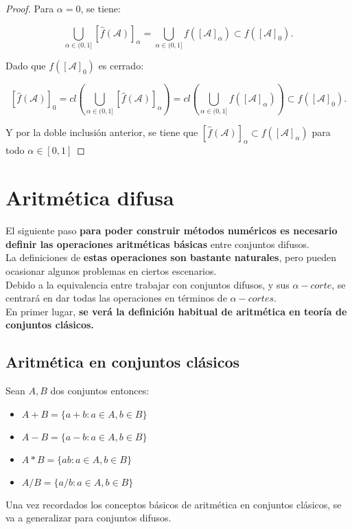 \begin{proof}
    Para $\alpha=0$, se tiene:
    
    $$
    \bigcup_{\alpha \in (0, 1]} [\hat{f}(\mathcal{A})]_\alpha = \bigcup_{\alpha \in (0, 1]} f([\mathcal{A}]_\alpha) \subset f([\mathcal{A}]_0).
	$$
	
	Dado que $f([\mathcal{A}]_0)$ es cerrado:
	
	$$
	[\hat{f}(\mathcal{A})]_0 = cl\left( \bigcup_{\alpha \in (0, 1]} [\hat{f}(\mathcal{A})]_\alpha  \right) = cl\left(\bigcup_{\alpha \in (0, 1]} f([\mathcal{A}]_\alpha) \right)	\subset f([\mathcal{A}]_0).
	    $$
	    
	    Y por la doble inclusión anterior, se tiene que $[\hat{f}(\mathcal{A})]_\alpha \subset f([\mathcal{A}]_\alpha)$ para todo $\alpha \in [0, 1]$
  \end{proof}


  \section{Aritmética difusa}
  El siguiente paso \textbf{para poder construir métodos numéricos es necesario definir las operaciones aritméticas básicas} entre conjuntos difusos.\\
  La definiciones de \textbf{estas operaciones son bastante naturales}, pero pueden ocasionar algunos problemas en ciertos escenarios.\\
  Debido a la equivalencia entre trabajar con conjuntos difusos, y sus $\alpha-corte$, se centrará en dar todas las operaciones en términos de $\alpha-cortes$.\\
  En primer lugar, \textbf{se verá la definición habitual de aritmética en teoría de conjuntos clásicos.}

  \subsection{Aritmética en conjuntos clásicos}
  Sean $A, B$ dos conjuntos entonces:
  \begin{itemize}
  \item $A+B=\{a+b : a \in A, b\in B\}$
  \item $A - B =\{a - b : a \in A, b\in B\}$
  \item $A * B =\{ab : a \in A, b\in B\}$
  \item $A / B =\{a/b : a \in A, b\in B\}$
  \end{itemize}

  Una vez recordados los conceptos básicos de aritmética en conjuntos clásicos, se va a generalizar para conjuntos difusos.

